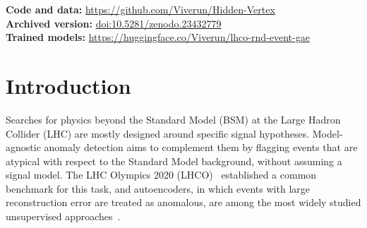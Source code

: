 \documentclass[11pt,a4paper]{article}
\newcommand{\pt}{\ensuremath{p_\mathrm{T}}\xspace}
\newcommand{\mjj}{\ensuremath{m_{jj}}\xspace}
\newcommand{\ptmean}{\ensuremath{\langle \pt \rangle}\xspace}
\begin{document}
\begin{titlepage}
\begin{center}
\begin{abstract}
event-level AUCs only to $0.44$--$0.50$, and retraining on a multiplicity-matched background does not
recover performance (AUC $0.40$--$0.42$, against a prediction fixed in advance of at least $0.47$).
Density scores on jet-level features reach $0.69$--$0.76$, and a Wasserstein-normalized autoencoder
(WNAE) on the same features reaches $0.72$ in a pilot and $0.64$ in a longer run; none passes the gate.
The WNAE was run on jet features and not on the graph model, and its longer-run settings were fixed after the
pilot test results had been seen. Complexity is at most a partial explanation. As a contrast, a
weakly supervised CWoLa-style bump hunt asks whether an \mjj window holds an excess, and trains on a pool
into which signal is injected, so it is not an unsupervised method. With the signal mass known, its
oracle window passes the gate from a signal fraction of $0.001$ (AUC $0.835$). A version that does not use the mass
(two grids of \mjj windows, fixed in advance) reaches only about $0.74$ and fails three of four
predictions fixed in advance. The benchmark code is public,
and I suggest \ptmean as a standard reference baseline for unsupervised methods on this dataset.
\end{abstract}
\end{center}
\vfill
\noindent\textbf{Code and data:} \url{https://github.com/Viverun/Hidden-Vertex}\\
\textbf{Archived version:} \href{https://doi.org/10.5281/zenodo.23432779}{doi:10.5281/zenodo.23432779}\\
\textbf{Trained models:} \url{https://huggingface.co/Viverun/lhco-rnd-event-gae}
\end{titlepage}

\section{Introduction}
\label{sec:intro}

Searches for physics beyond the Standard Model (BSM) at the Large Hadron Collider (LHC) are
mostly designed around specific signal hypotheses. Model-agnostic anomaly detection aims to
complement them by flagging events that are atypical with respect to the Standard Model
background, without assuming a signal model. The LHC Olympics 2020 (LHCO)~\cite{Kasieczka:2021xcg}
established a common benchmark for this task, and autoencoders, in which events with large
reconstruction error are treated as anomalous, are among the most widely studied unsupervised
approaches~\cite{Farina:2018fyg,Heimel:2018mkt,Finke:2021sdf,Atkinson:2021nlt}.
\end{document}
